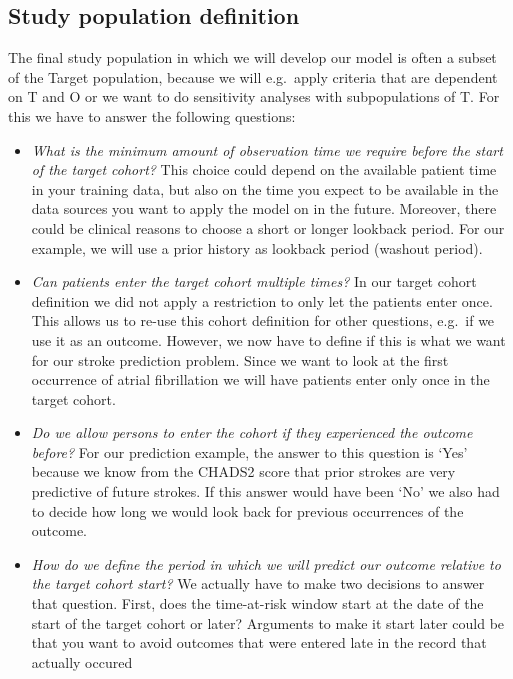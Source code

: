 \documentclass[]{article}
\begin{document}
\subsection{Study population
definition}\label{study-population-definition}

The final study population in which we will develop our model is often a
subset of the Target population, because we will e.g.~apply criteria
that are dependent on T and O or we want to do sensitivity analyses with
subpopulations of T. For this we have to answer the following questions:

\begin{itemize}
\item
  \emph{What is the minimum amount of observation time we require before
  the start of the target cohort?} This choice could depend on the
  available patient time in your training data, but also on the time you
  expect to be available in the data sources you want to apply the model
  on in the future. Moreover, there could be clinical reasons to choose
  a short or longer lookback period. For our example, we will use a
  prior history as lookback period (washout period).
\item
  \emph{Can patients enter the target cohort multiple times?} In our
  target cohort definition we did not apply a restriction to only let
  the patients enter once. This allows us to re-use this cohort
  definition for other questions, e.g.~if we use it as an outcome.
  However, we now have to define if this is what we want for our stroke
  prediction problem. Since we want to look at the first occurrence of
  atrial fibrillation we will have patients enter only once in the
  target cohort.
\item
  \emph{Do we allow persons to enter the cohort if they experienced the
  outcome before?} For our prediction example, the answer to this
  question is `Yes' because we know from the CHADS2 score that prior
  strokes are very predictive of future strokes. If this answer would
  have been `No' we also had to decide how long we would look back for
  previous occurrences of the outcome.
\item
  \emph{How do we define the period in which we will predict our outcome
  relative to the target cohort start?} We actually have to make two
  decisions to answer that question. First, does the time-at-risk window
  start at the date of the start of the target cohort or later?
  Arguments to make it start later could be that you want to avoid
  outcomes that were entered late in the record that actually occured

\end{itemize}
\end{document}
